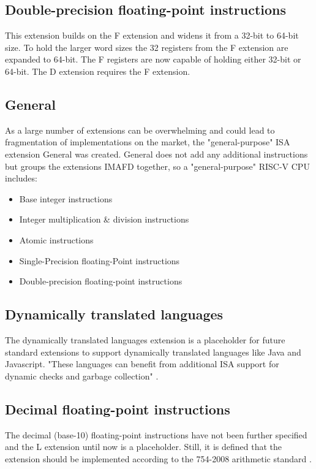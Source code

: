 \subsection{Double-precision floating-point instructions}
This extension builds on the F extension and widens it from a 32-bit to
64-bit size. To hold the larger word sizes the 32 registers
from the F extension are expanded to 64-bit.
The F registers are now capable of holding either 32-bit or
64-bit. The D extension requires the F extension.

\subsection{General}
As a large number of extensions can be overwhelming and
could lead to fragmentation of implementations on the market,
the "general-purpose" ISA extension General was created.
General does not add any additional instructions but
groups the extensions IMAFD together, so a
"general-purpose" RISC-V CPU includes:
\begin{itemize}
    \item Base integer instructions
    \item Integer multiplication \& division instructions
    \item Atomic instructions
    \item Single-Precision floating-Point instructions
    \item Double-precision floating-point instructions
\end{itemize}

\subsection{Dynamically translated languages}
The dynamically translated languages extension is
a placeholder for future standard extensions
to support dynamically translated languages like Java
and Javascript. "These languages can benefit from additional
ISA support for dynamic checks and garbage collection"
\cite[p.~87]{risc-v_isa_manual_user_level}.

\subsection{Decimal floating-point instructions}
The decimal (base-10) floating-point instructions have not been
further specified and the L extension until now is
a placeholder. Still, it is defined that the extension should
be implemented according to the 754-2008 arithmetic standard 
\cite{ieee_754-2008}.

